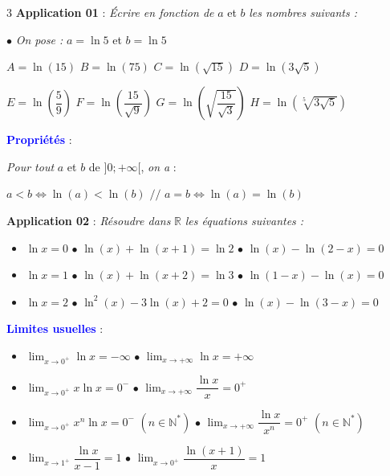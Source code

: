 \documentclass[a4paper,landscape]{article}
\begin{document}
\begin{multicols}{3}
\vspace{0.5mm}
\noindent\colorbox{jaune}{\textbf{Application 01}} : \textit{Écrire en fonction de} $a$ et $b$ \textit{les nombres suivants :}

\noindent $\bullet$ \textit{On pose :} $a = \ln 5$ et $b = \ln 5$

\noindent $A = \ln(15)$ \quad $B = \ln(75)$ \quad $C = \ln\left(\sqrt{15}\right)$ \quad $D = \ln\left(3\sqrt{5}\right)$

\noindent $E = \ln\left(\dfrac{5}{9}\right)$ \quad $F = \ln\left(\dfrac{15}{\sqrt{9}}\right)$ \quad $G = \ln\left(\sqrt{\dfrac{15}{\sqrt{3}}}\right)$ \quad $H = \ln\left(\sqrt[5]{3\sqrt{5}}\right)$

\vspace{0.5mm}
\noindent\textcolor{blue}{\textbf{Propriétés}} :

\noindent\textit{Pour tout} $a$ et $b$ de $]0;+\infty[$, \textit{on a} :

\noindent $a < b \Leftrightarrow \ln(a) < \ln(b)$ $//$ $a = b \Leftrightarrow \ln(a) = \ln(b)$

\vspace{0.5mm}
\noindent\colorbox{jaune}{\textbf{Application 02}} : \textit{Résoudre dans} $\mathbb{R}$ \textit{les équations suivantes :}

\begin{itemize}\setlength{\itemsep}{0pt}
\item $\ln x = 0$ \quad $\bullet$ $\ln(x) + \ln(x+1) = \ln 2$ \quad $\bullet$ $\ln(x) - \ln(2-x) = 0$
\item $\ln x = 1$ \quad $\bullet$ $\ln(x) + \ln(x+2) = \ln 3$ \quad $\bullet$ $\ln(1-x) - \ln(x) = 0$
\item $\ln x = 2$ \quad $\bullet$ $\ln^2(x) - 3\ln(x) + 2 = 0$ \quad $\bullet$ $\ln(x) - \ln(3-x) = 0$
\end{itemize}

\vspace{0.5mm}
\noindent\textcolor{blue}{\textbf{Limites usuelles}} :

\begin{itemize}\setlength{\itemsep}{0pt}
\item $\displaystyle\lim_{x \to 0^+} \ln x = -\infty$ \hspace{18mm} $\bullet$ $\displaystyle\lim_{x \to +\infty} \ln x = +\infty$
\item $\displaystyle\lim_{x \to 0^+} x \ln x = 0^-$ \hspace{18mm} $\bullet$ $\displaystyle\lim_{x \to +\infty} \dfrac{\ln x}{x} = 0^+$
\item $\displaystyle\lim_{x \to 0^+} x^n \ln x = 0^-$ \quad $(n \in \mathbb{N}^*)$ \hspace{3mm} $\bullet$ $\displaystyle\lim_{x \to +\infty} \dfrac{\ln x}{x^n} = 0^+$ \quad $(n \in \mathbb{N}^*)$
\item $\displaystyle\lim_{x \to 1^+} \dfrac{\ln x}{x-1} = 1$ \hspace{18mm} $\bullet$ $\displaystyle\lim_{x \to 0^+} \dfrac{\ln(x+1)}{x} = 1$
\end{itemize}


\end{multicols}
\end{document}
